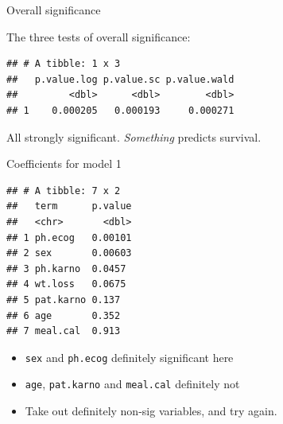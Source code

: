 \documentclass[ignorenonframetext,]{beamer}
\newenvironment{Shaded}{\begin{snugshade}}{\end{snugshade}}
\newcommand{\FloatTok}[1]{\textcolor[rgb]{0.00,0.00,0.81}{#1}}
\newcommand{\KeywordTok}[1]{\textcolor[rgb]{0.13,0.29,0.53}{\textbf{#1}}}
\newcommand{\NormalTok}[1]{#1}
\newcommand{\OperatorTok}[1]{\textcolor[rgb]{0.81,0.36,0.00}{\textbf{#1}}}
\newcommand{\StringTok}[1]{\textcolor[rgb]{0.31,0.60,0.02}{#1}}
\begin{document}
\begin{frame}[fragile]{Overall significance}
\protect\hypertarget{overall-significance}{}

The three tests of overall significance: \small

\begin{Shaded}
\end{Shaded}

\begin{verbatim}
## # A tibble: 1 x 3
##   p.value.log p.value.sc p.value.wald
##         <dbl>      <dbl>        <dbl>
## 1    0.000205   0.000193     0.000271
\end{verbatim}

\normalsize

All strongly significant. \emph{Something} predicts survival.

\end{frame}

\begin{frame}[fragile]{Coefficients for model 1}
\protect\hypertarget{coefficients-for-model-1}{}

\small

\begin{Shaded}
\end{Shaded}

\begin{verbatim}
## # A tibble: 7 x 2
##   term      p.value
##   <chr>       <dbl>
## 1 ph.ecog   0.00101
## 2 sex       0.00603
## 3 ph.karno  0.0457 
## 4 wt.loss   0.0675 
## 5 pat.karno 0.137  
## 6 age       0.352  
## 7 meal.cal  0.913
\end{verbatim}

\normalsize

\begin{itemize}
\item
  \texttt{sex} and \texttt{ph.ecog} definitely significant here
\item
  \texttt{age}, \texttt{pat.karno} and \texttt{meal.cal} definitely not
\item
  Take out definitely non-sig variables, and try again.
\end{itemize}

\end{frame}
\end{document}
